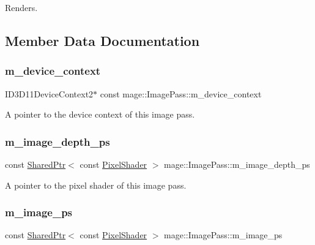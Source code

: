 Renders. 

\subsection{Member Data Documentation}
\hypertarget{classmage_1_1_image_pass_ac4eef3a91fd1751073f02f0e1b6efcc3}{}\label{classmage_1_1_image_pass_ac4eef3a91fd1751073f02f0e1b6efcc3} 
\subsubsection{\texorpdfstring{m\+\_\+device\+\_\+context}{m\_device\_context}}
{\footnotesize\ttfamily I\+D3\+D11\+Device\+Context2$\ast$ const mage\+::\+Image\+Pass\+::m\+\_\+device\+\_\+context\hspace{0.3cm}{\ttfamily [private]}}

A pointer to the device context of this image pass. \hypertarget{classmage_1_1_image_pass_a1437d3e0816374dc9b79118b2bc649b3}{}\label{classmage_1_1_image_pass_a1437d3e0816374dc9b79118b2bc649b3} 
\subsubsection{\texorpdfstring{m\+\_\+image\+\_\+depth\+\_\+ps}{m\_image\_depth\_ps}}
{\footnotesize\ttfamily const \hyperlink{namespacemage_a1e01ae66713838a7a67d30e44c67703e}{Shared\+Ptr}$<$ const \hyperlink{namespacemage_a27ecaf266420ee7a494d64edc0757129}{Pixel\+Shader} $>$ mage\+::\+Image\+Pass\+::m\+\_\+image\+\_\+depth\+\_\+ps\hspace{0.3cm}{\ttfamily [private]}}

A pointer to the pixel shader of this image pass. \hypertarget{classmage_1_1_image_pass_a03c8e8ae45da02959d35b8842175e466}{}\label{classmage_1_1_image_pass_a03c8e8ae45da02959d35b8842175e466} 
\subsubsection{\texorpdfstring{m\+\_\+image\+\_\+ps}{m\_image\_ps}}
{\footnotesize\ttfamily const \hyperlink{namespacemage_a1e01ae66713838a7a67d30e44c67703e}{Shared\+Ptr}$<$ const \hyperlink{namespacemage_a27ecaf266420ee7a494d64edc0757129}{Pixel\+Shader} $>$ mage\+::\+Image\+Pass\+::m\+\_\+image\+\_\+ps\hspace{0.3cm}{\ttfamily [private]}}

